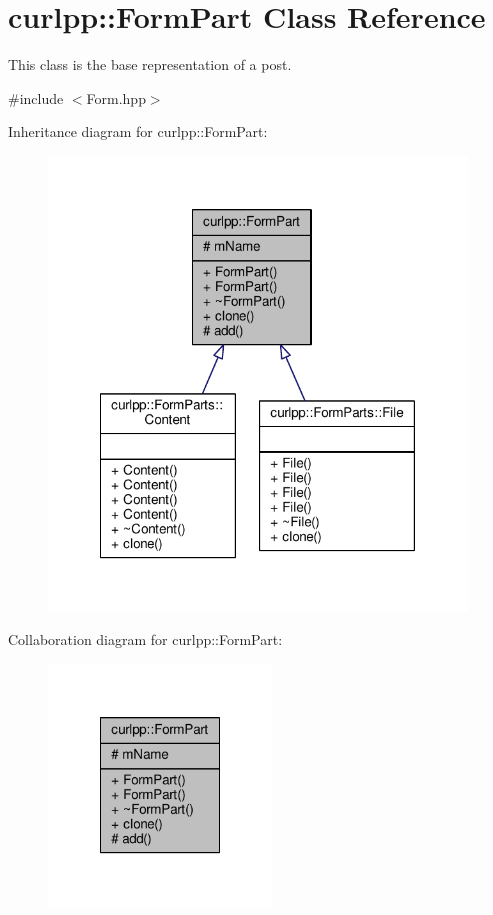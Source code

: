 \hypertarget{classcurlpp_1_1FormPart}{\section{curlpp\-:\-:Form\-Part Class Reference}
\label{classcurlpp_1_1FormPart}
}


This class is the base representation of a post.  




{\ttfamily \#include $<$Form.\-hpp$>$}



Inheritance diagram for curlpp\-:\-:Form\-Part\-:\nopagebreak
\begin{figure}[H]
\begin{center}
\leavevmode
\includegraphics[width=315pt]{classcurlpp_1_1FormPart__inherit__graph}
\end{center}
\end{figure}


Collaboration diagram for curlpp\-:\-:Form\-Part\-:\nopagebreak
\begin{figure}[H]
\begin{center}
\leavevmode
\includegraphics[width=168pt]{classcurlpp_1_1FormPart__coll__graph}
\end{center}
\end{figure}

